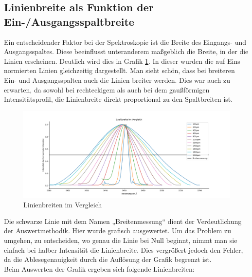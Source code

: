 \subsection{Linienbreite als Funktion der Ein-/Ausgangsspaltbreite}

Ein entscheidender Faktor bei der Spektroskopie ist die Breite des Eingangs- und Ausgangsspaltes. Diese beeinflusst unteranderem maßgeblich die Breite, 
in der die Linien erscheinen. Deutlich wird dies in Grafik \ref{LinVergleich}. In dieser wurden die auf Eins normierten Linien gleichzeitig dargestellt. 
Man sieht schön, dass bei breiteren Ein- und Ausgangsspalten auch die Linien breiter werden. Dies war auch zu erwarten, da sowohl bei rechteckigem als auch bei 
dem gaußförmigen Intensitätsprofil, die Linienbreite direkt proportional zu den Spaltbreiten ist.
\begin{figure}[h]
    \centering
    \includegraphics[width = \linewidth]{Bilder/LinienbreiteVergleich.png}
    \caption{Linienbreiten im Vergleich}
    \label{LinVergleich}
\end{figure}
Die schwarze Linie mit dem Namen „Breitenmessung“ dient der Verdeutlichung der Auswertmethodik. Hier wurde grafisch ausgewertet. Um das Problem zu umgehen, 
zu entscheiden, wo genau die Linie bei Null beginnt, nimmt man sie einfach bei halber Intensität die Linienbreite. 
Dies vergrößert jedoch den Fehler, da die Ablesegenauigkeit durch die Auflösung der Grafik begrenzt ist.\\
Beim Auswerten der Grafik ergeben sich folgende Linienbreiten:
